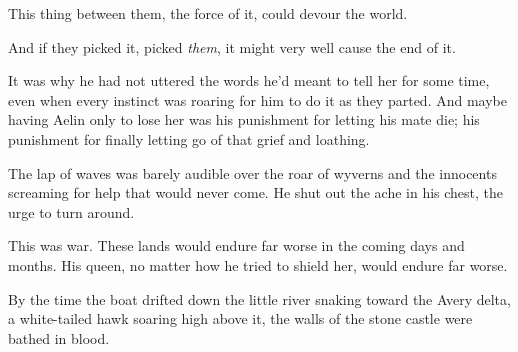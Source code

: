 This thing between them, the force of it, could devour the world.

And if they picked it, picked \emph{them}, it might very well cause the end of it.

It was why he had not uttered the words he'd meant to tell her for some time, even when every instinct was roaring for him to do it as they parted.
And maybe having Aelin only to lose her was his punishment for letting his mate die; his punishment for finally letting go of that grief and loathing.

The lap of waves was barely audible over the roar of wyverns and the innocents screaming for help that would never come.
He shut out the ache in his chest, the urge to turn around.

This was war.
These lands would endure far worse in the coming days and months.
His queen, no matter how he tried to shield her, would endure far worse.

By the time the boat drifted down the little river snaking toward the Avery delta, a white-tailed hawk soaring high above it, the walls of the stone castle were bathed in blood.
